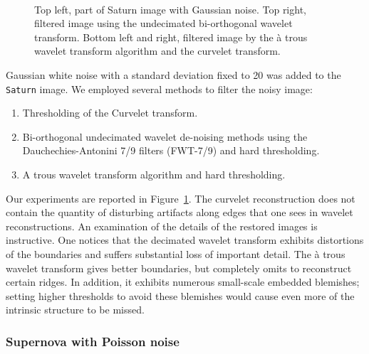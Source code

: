 \begin{figure}[htb]
\centerline{
\vbox{
\hbox{
}
\hbox{
}}
}
\caption{Top left, part of Saturn image with Gaussian noise. Top right,
filtered image using the undecimated bi-orthogonal wavelet transform.
Bottom left and right, filtered image by the \`a trous wavelet 
transform algorithm and the curvelet transform.}
\label{fig_sub_saturn_cur_filter}
\end{figure}

Gaussian white noise with a standard deviation
fixed to 20 was added to the {\tt Saturn} image.
We employed several methods to filter the noisy image:
\begin{enumerate}
\item Thresholding of the Curvelet transform.
\item Bi-orthogonal undecimated wavelet de-noising methods using  the
      Dau\-che\-chies-An\-to\-ni\-ni 7/9 fil\-ters (FWT-7/9) and hard thresholding.
\item A trous wavelet transform algorithm and hard thresholding.
\end{enumerate}
Our experiments are reported in Figure~\ref{fig_sub_saturn_cur_filter}.  The
curvelet reconstruction does not contain the quantity of disturbing artifacts
along edges that one sees in wavelet reconstructions. An examination
of the details of the restored images %
is instructive. One notices that the decimated wavelet transform
exhibits distortions of the boundaries and suffers substantial loss of
important detail.  The \`a trous  wavelet transform gives better
boundaries, but completely omits to reconstruct certain ridges. 
In addition, it exhibits numerous small-scale embedded
blemishes; setting higher thresholds to avoid these blemishes would
cause even more of the intrinsic structure to be missed.


\subsubsection{Supernova with Poisson noise}

